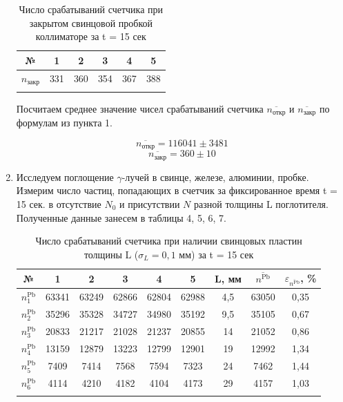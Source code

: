 \documentclass[a4paper, 12pt]{article}%
\begin{document}
\begin{enumerate}
	\begin{longtable}{|c|c|c|c|c|c|}
		\hline
		№ & 1 & 2 & 3 & 4 & 5\\ \hline
		$n_{\text{закр}}$ & 331 & 360 & 354 & 367 & 388 \\ \hline
		\caption{Число срабатываний счетчика при закрытом свинцовой пробкой коллиматоре за t = 15 сек}
	\end{longtable}

	Посчитаем среднее значение чисел срабатываний счетчика $\overline{n_{\text{откр}}}$ и $\overline{n_{\text{закр}}}$ по формулам из пункта 1.
			
	$$ \overline{n_{\text{откр}}} = 116041 \pm 3481$$
	$$ \overline{n_{\text{закр}}} = 360 \pm 10$$
				
	\item Исследуем поглощение $\gamma$-лучей в свинце, железе, алюминии, пробке.
	Измерим число частиц, попадающих в счетчик за фиксированное время t = 15 сек. в отсутствие $N_0$ и присутствии $N$ разной толщины L поглотителя. Полученные данные занесем в таблицы 4, 5, 6, 7.
	
	
	\begin{longtable}{|c|c|c|c|c|c|c|c|c|}
		\hline
		№ & 1 & 2 & 3 & 4 & 5 & L, мм &  $\overline{n^{\text{Pb}}}$ & $\varepsilon_{\overline{n^{\text{Pb}}}}$, \% \\ \hline
		$n_{1}^{\text{Pb}}$ & 63341 & 63249 & 62866 & 62804 & 62988 & 4,5 & 63050 & 0,35\\ \hline
		$n_{2}^{\text{Pb}}$ & 35296 & 35328 & 34727 & 34980 & 35192 & 9,5 & 35105 & 0,67\\ \hline
		$n_{3}^{\text{Pb}}$ & 20833 & 21217 & 21028 & 21237 & 20855 & 14 & 21052 & 0,86 \\ \hline
		$n_{4}^{\text{Pb}}$ & 13159 & 12879 & 13223 & 12799 & 12901 & 19 & 12992 & 1,34\\ \hline
		$n_{5}^{\text{Pb}}$ & 7409 & 7414 & 7568 & 7594 & 7323 & 24 & 7462 & 1,44\\
	    \hline
		$n_{6}^{\text{Pb}}$ & 4114 & 4210 & 4182 & 4104 & 4173 & 29 & 4157 & 1,03\\
		\hline
		
		\caption{Число срабатываний счетчика при наличии свинцовых пластин толщины L ($\sigma_L = 0,1$ мм) за t = 15 сек}
	\end{longtable}
	

\end{enumerate}
\end{document}
